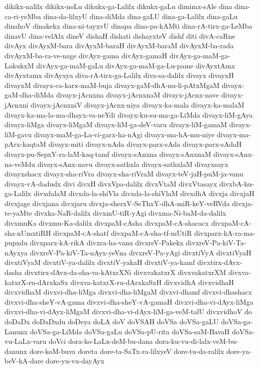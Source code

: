 {dikikx-nalilx
dikikx-noLu
dikukx-ga-Lalilx
dikukx-gaLu
dimimx-sAle
dina
dina-ca-ri-yeMba
dina-da-lilxyU
dina-diMda
dina-gaLU
dina-ga-Lalilx
dina-gaLu
dinahoV
dinakekx
dina-ni-tayxvU
dinapa
dina-pa-kAMti
dina-rA-tirx-ga-LeMba
dinavU
dina-velAlx
dineV
dishaH
dishati
dishayxteV
dishf
diti
divA-caRne
divAyx
divAyxM-bara
divAyxM-baraH
divAyxM-baraM
divAyxM-ba-rada
divAyxM-ba-ra-ve-nage
divAyx-gama
divAyx-gamaH
divAyx-ga-maM-ga-LakukxM
divAyx-ga-maM-gaLu
divAyx-ga-maM-ga-Lu-pame
divAyxtAmx
divAyxtamx
divAyxya
diva-rA-tirx-ga-Lalilx
diva-sa-dalilx
divayx
divayxH
divayxM
divayx-ca-karx-maM-buja
divayx-gaM-dhA-nu-li-pAtxMgaM
divayx-gaM-dha-diMda
divayx-jAcnxna
divayx-jAcnxnaM
divayx-jAcnx-nave
divayx-jAcnxni
divayx-jAcnxniV
divayx-jAcnx-niya
divayx-ka-mala
divayx-ka-malaM
divayx-ka-ma-la-ma-dhayx-va-neYdi
divayx-ku-su-ma-ga-LiMda
divayx-liM-gAya
divayx-liMga
divayx-liMgaM
divayx-liM-ga-deV-varu
divayx-liM-gamaM
divayx-liM-gavu
divayx-maM-ga-La-vi-garx-ha-nAgi
divayx-ma-hA-mu-niye
divayx-ma-pArx-kaqtaM
divayx-miti
divayx-nAda
divayx-parx-sAda
divayx-parx-sAdaH
divayx-pu-SepxY-ra-laM-kaq-tamf
divayx-sAnxna
divayx-sAnxnaM
divayx-sAnx-na-veMdu
divayx-sAnx-navu
divayx-sathxla
divayx-sathxlaM
divayxsayx
divayxshacx
divayx-sha-riVra
divayx-sha-riVraM
divayx-teV-jaH-puM-ja-vanu
divayx-vA-dadudx
divi
divxH
divxVpa-dalilx
divxVtaM
divxVtasayx
divxbA-hu-ga-Lalilx
divxdalaM
divxda-la-shiVla
divxda-la-shiVlaM
divxdhA
divxja
divxjaH
divxjage
divxjana
divxjaru
divxja-sherxV-SeThxY-dhA-miR-keY-veRVda
divxja-te-yaMte
divxka-NaR-dalilx
divxmU-tiR-yAgi
divxma-Ni-baM-da-dalilx
divxmuKa
divxmu-Ka-dalilx
divxpaM-cAsha
divxpaM-cA-shacacx
divxpaM-cA-sha-nUmxtiRH
divxpaM-cA-shatf
divxpaM-cA-sha-tf-mUtiR
divxparx-kA-ra-ma-pupxdu
divxparx-kA-rikA
divxra-ha-vanu
divxreV-Pakekx
divxreV-Pa-kiV-Ta-nAyxya
divxreV-Pa-kiV-Ta-nAyx-yeVna
divxreV-Pa-yAgi
divxtiVyA
divxtiVyaH
divxtiVyaM
divxtiV-ya-dalilx
divxtiV-yakaH
divxtiV-ya-kamf
divxtirx-dAvx-dasha
divxtirx-dAvx-da-sha-va-kAtxrXNi
divxvakatxrX
divxvakatxrXM
divxva-katxrX-ru-dArxkaSx
divxva-katxrX-ru-dArxkaSxH
divxvidhA
divxvidhaH
divxvidhaM
divxvi-dha-liMga
divxvi-dha-liMgaM
divxvi-dhamf
divxvi-dhashacx
divxvi-dha-sheY-vA-gama
divxvi-dha-sheY-vA-gamaH
divxvi-dha-vi-dAyx-liMga
divxvi-dha-vi-dAyx-liMgaM
divxvi-dha-vi-dAyx-liM-ga-veM-talU
divxvidhoV
do
doDaDx
doDaDxdu
doDeya
doLA
doV
doVSAH
doVSa
doVSa-gaLU
doVSa-ga-Lanunx
doVSa-ga-LiMda
doVSa-gaLu
doVSa-pU-rita
doVSa-saM-BavaH
doVSa-vu-LaLx-varu
doVci
dora-ko-LaLx-deM-bu-dana
dora-ku-vu-di-lalx-veM-bu-danunx
dore-koM-buva
doreta
dore-ta-SaTx-ra-lilxyeV
dore-tu-da-ralilx
dore-ya-beV-kA-dare
dore-yu-vu-dayAyx
}
